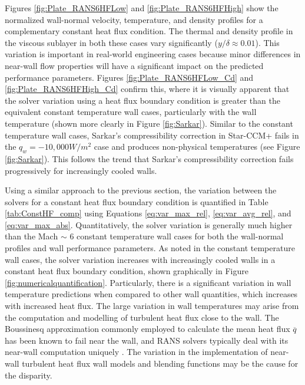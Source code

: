 \documentclass[journal ]{new-aiaa}
\begin{document}
Figures \ref{fig:Plate_RANS6HFLow} and \ref{fig:Plate_RANS6HFHigh} show the normalized wall-normal velocity, temperature, and density profiles for a complementary constant heat flux condition. The thermal and density profile in the viscous sublayer in both these cases vary significantly ($y/\delta \approx 0.01$). This variation is important in real-world engineering cases because minor differences in near-wall flow properties will have a significant impact on the predicted performance parameters. Figures \ref{fig:Plate_RANS6HFLow_Cd} and \ref{fig:Plate_RANS6HFHigh_Cd} confirm this, where it is visually apparent that the solver variation using a heat flux boundary condition is greater than the equivalent constant temperature wall cases, particularly with the wall temperature (shown more clearly in Figure \ref{fig:Sarkar}). Similar to the constant temperature wall cases, Sarkar's compressibility correction in Star-CCM+ fails in the $q_w = -10,000 W/m^2$ case and produces non-physical temperatures (see Figure \ref{fig:Sarkar}). This follows the trend that Sarkar's compressibility correction fails progressively for increasingly cooled walls. 

Using a similar approach to the previous section, the variation between the solvers for a constant heat flux boundary condition is quantified in Table \ref{tab:ConstHF_comp} using Equations \ref{eq:var_max_rel}, \ref{eq:var_avg_rel}, and \ref{eq:var_max_abs}. Quantitatively, the solver variation is generally much higher than the Mach $\sim$ 6 constant temperature wall cases for both the wall-normal profiles and wall performance parameters. As noted in the constant temperature wall cases, the solver variation increases with increasingly cooled walls in a constant heat flux boundary condition, shown graphically in Figure \ref{fig:numericalquantification}. Particularly, there is a significant variation in wall temperature predictions when compared to other wall quantities, which increases with increased heat flux. The large variation in wall temperatures may arise from the computation and modelling of turbulent heat flux close to the wall. The Boussinesq approximation commonly employed to calculate the mean heat flux $\overline{q}$ has been known to fail near the wall, and RANS solvers typically deal with its near-wall computation uniquely \cite{SiemensPLM}. The variation in the implementation of near-wall turbulent heat flux wall models and blending functions may be the cause for the disparity. 
\end{document}
